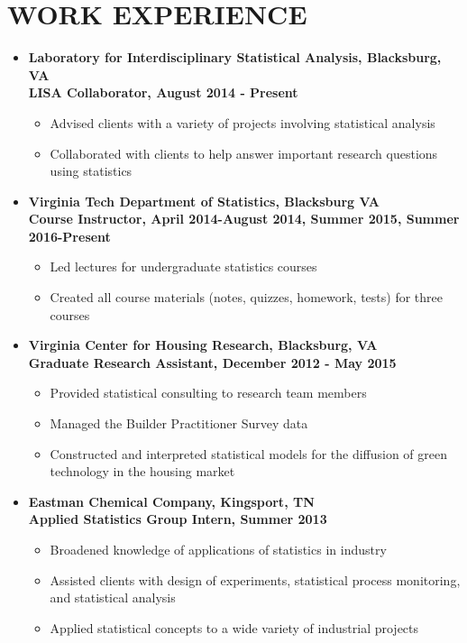 \documentclass[10pt]{article}
\begin{document}
\section*{WORK EXPERIENCE}
\begin{itemize}
\item[] \textbf{Laboratory for Interdisciplinary Statistical Analysis, Blacksburg, VA\\
LISA Collaborator, August 2014 - Present}
\begin{itemize}
\item Advised clients with a variety of projects involving statistical analysis
\item Collaborated with clients to help answer important research questions using statistics 
\end{itemize}


\item[] \textbf{Virginia Tech Department of Statistics, Blacksburg VA\\
Course Instructor, April 2014-August 2014, Summer 2015, Summer 2016-Present}
\begin{itemize}
\item Led lectures for undergraduate statistics courses
\item Created all course materials (notes, quizzes, homework, tests) for three courses
\end{itemize} 
 
 
\item[] \textbf{Virginia Center for Housing Research, Blacksburg, VA\\
Graduate Research Assistant, December 2012 - May 2015}
\begin{itemize} 
\item Provided statistical consulting to research team members
\item Managed the Builder Practitioner Survey data
\item Constructed and interpreted statistical models for the diffusion of green technology in the housing market
\end{itemize} 

\item[] \textbf{Eastman Chemical Company, Kingsport, TN\\
Applied Statistics Group Intern, Summer 2013}
\begin{itemize}
\item Broadened knowledge of applications of statistics in industry
\item Assisted clients with design of experiments, statistical process monitoring, and statistical analysis
\item Applied statistical concepts to a wide variety of industrial projects
\end{itemize} 



\end{itemize}
\end{document}
